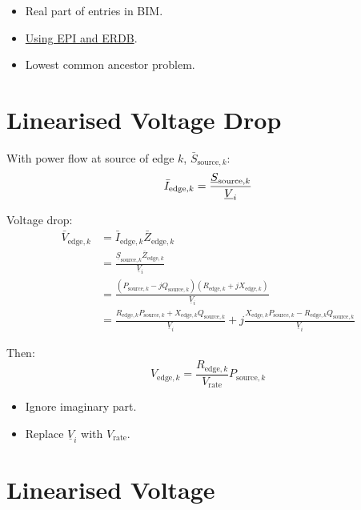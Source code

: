 \documentclass[
]{book}
\providecommand{\tightlist}{%
  \setlength{\itemsep}{0pt}\setlength{\parskip}{0pt}}
\begin{document}
\begin{itemize}
\tightlist
\item
  Real part of entries in BIM.
\item
  \protect\hyperlink{linearVoltageDrop}{Using EPI and ERDB}.
\item
  Lowest common ancestor problem.
\end{itemize}

\hypertarget{linearVoltageDrop}{%
\section{Linearised Voltage Drop}\label{linearVoltageDrop}}

With power flow at source of edge \(k\), \(\bar{S}_{\text{source}, k}\):
\[
\bar{I}_{\text{edge}, k}
  = \frac{\underline{S}_{\text{source}, k}}{\underline{V}_i} \\
\]

Voltage drop:
\[
\begin{aligned}
  \bar{V}_{\text{edge}, k}
  &= \bar{I}_{\text{edge}, k} \bar{Z}_{\text{edge}, k} \\
  &= \frac{
    \underline{S}_{\text{source}, k} \bar{Z}_{\text{edge}, k}
  }{\underline{V}_i} \\
  &= \frac{
    \left(P_{\text{source}, k} - j Q_{\text{source}, k} \right)
    \left(R_{\text{edge}, k} + j X_{\text{edge}, k} \right)
  }{\underline{V}_i} \\
  &= \frac{
    R_{\text{edge}, k} P_{\text{source}, k}
    + X_{\text{edge}, k} Q_{\text{source}, k}
  }{\underline{V}_i}
  + j \frac{
    X_{\text{edge}, k} P_{\text{source}, k}
    - R_{\text{edge}, k} Q_{\text{source}, k}
  }{\underline{V}_i}
\end{aligned}
\]

Then:
\[
V_{\text{edge}, k} =
  \frac{R_{\text{edge}, k}}{V_\text{rate}} P_{\text{source}, k}
\]

\begin{itemize}
\tightlist
\item
  Ignore imaginary part.
\item
  Replace \(\underline{V}_i\) with \(V_\text{rate}\).
\end{itemize}

\hypertarget{linearised-voltage}{%
\section{Linearised Voltage}\label{linearised-voltage}}
\end{document}
